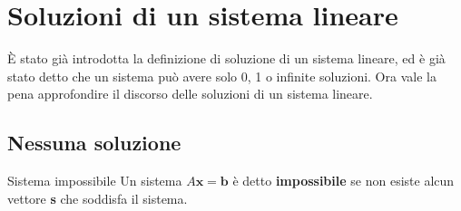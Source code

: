 \section{Soluzioni di un sistema lineare}
È stato già introdotta la definizione di soluzione di un sistema lineare, ed è già stato detto che un sistema può avere solo 0, 1 o infinite soluzioni. Ora vale la pena approfondire il discorso delle soluzioni di un sistema lineare.

\subsection{Nessuna soluzione}
\begin{newdef}{Sistema impossibile}
    Un sistema $A\textbf{x} = \textbf{b}$ è detto \textbf{impossibile} se non esiste alcun vettore \textbf{s} che soddisfa il sistema.
\end{newdef}

